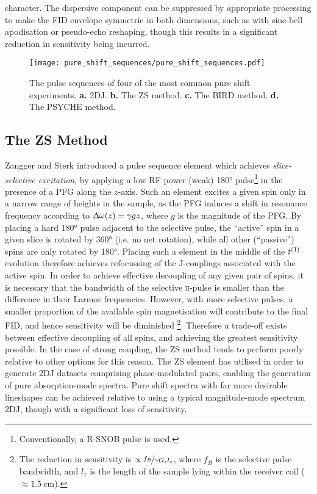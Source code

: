 character. The dispersive component can be suppressed by appropriate processing
to make the FID envelope symmetric in both dimensions, such as with sine-bell
apodisation or pseudo-echo reshaping\cite{Bax1981}, though this results in a
significant reduction in sensitivity being incurred.
\begin{figure}
    \centering
    \texttt{[image: pure\_shift\_sequences/pure\_shift\_sequences.pdf]}
    \caption[
        The pulse sequences of some common pure shift experiments.
    ]{
        The pulse sequences of four of the most common pure shift experiments.
        \textbf{a.} \acs{2DJ}.
        \textbf{b.} The \acs{ZS} method.
        \textbf{c.} The \acs{BIRD} method.
        \textbf{d.} The \acs{PSYCHE} method.
    }
    \label{fig:pure_shift_seqs}
\end{figure}

\subsection{The \acl{ZS} Method}
\label{subsec:ZS}
Zangger and Sterk introduced a pulse sequence element which achieves
\emph{slice-selective excitation}, by applying a low \ac{RF} power (weak) \ang{180}
pulse\footnote{Conventionally, a R-SNOB pulse is used\cite{Kupce1995}.} in the
presence of a \ac{PFG} along the $z$-axis\cite{Zangger1997}. Such an element
excites a
given spin only in a narrow range of heights in the sample, as the \ac{PFG}
induces a shift in resonance frequency according to $\Updelta \omega(z) = \gamma
gz$, where $g$ is the magnitude of the \ac{PFG}. By placing a hard
\ang{180} pulse adjacent to the selective pulse, the
``active'' spin in a given slice is rotated by \ang{360} (i.e. no net
rotation), while all other (``passive'') spins are only rotated by \ang{180}.
Placing such a element in the middle of the $t^{(1)}$ evolution therefore
achieves refocussing of the J-couplings associated with the active
spin\cite{Aguilar2010}. In order to achieve effective decoupling of any given
pair of spins, it is necessary that the bandwidth of the selective π-pulse is
smaller than the difference in their Larmor frequencies. However, with more
selective pulses, a smaller proportion of the available spin magnetisation will
contribute to the final FID, and hence sensitivity will be diminished
\footnote{
    The reduction in sensitivity is $\propto \nicefrac{f_B}{\gamma G_z l_z}$,
    where $f_B$ is the selective pulse bandwidth, and $l_z$ is the length of
    the sample lying within the receiver coil ($\approx
    \qty{1.5}{\centi\meter}$).
}.
Therefore a trade-off exists between effective decoupling of all spins, and
achieving the greatest sensitivity possible. In the case of strong coupling,
the \ac{ZS} method tends to perform poorly relative to other options for this
reason. The \ac{ZS} element has utilised in order to generate \ac{2DJ} datasets
comprising phase-modulated pairs, enabling the generation of pure
absorption-mode spectra\cite{Pell2007}. Pure shift spectra with far more
desirable lineshapes can be achieved relative to using a typical magnitude-mode
spectrum \ac{2DJ}, though with a significant loss of sensitivity.

